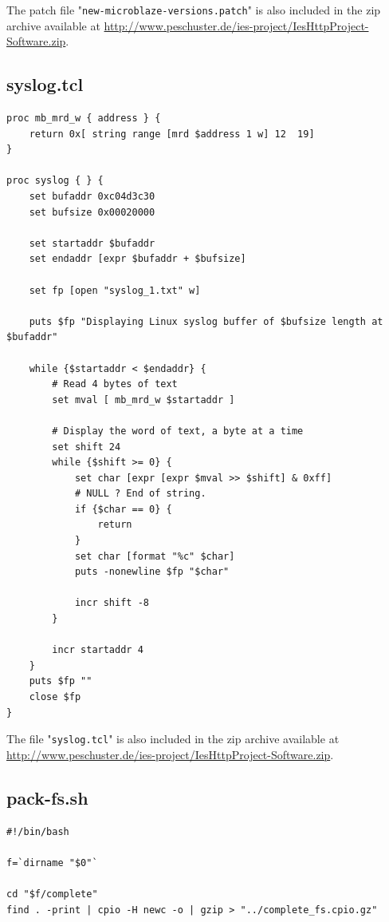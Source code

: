 The patch file "\texttt{new-microblaze-versions.patch}" is also included in the zip archive available at \url{http://www.peschuster.de/ies-project/IesHttpProject-Software.zip}.
\\

\subsection{syslog.tcl}
\label{subsec:syslog}

\begin{verbatim}
proc mb_mrd_w { address } {
    return 0x[ string range [mrd $address 1 w] 12  19]
}

proc syslog { } {
    set bufaddr 0xc04d3c30
    set bufsize 0x00020000

    set startaddr $bufaddr
    set endaddr [expr $bufaddr + $bufsize]
	
    set fp [open "syslog_1.txt" w]

    puts $fp "Displaying Linux syslog buffer of $bufsize length at $bufaddr"
	
    while {$startaddr < $endaddr} {
        # Read 4 bytes of text
        set mval [ mb_mrd_w $startaddr ]

        # Display the word of text, a byte at a time
        set shift 24
        while {$shift >= 0} {
            set char [expr [expr $mval >> $shift] & 0xff]
            # NULL ? End of string.
            if {$char == 0} {
                return
            }
            set char [format "%c" $char]
            puts -nonewline $fp "$char"

            incr shift -8
        }

        incr startaddr 4
    }
    puts $fp ""
    close $fp
}
\end{verbatim}

The file "\texttt{syslog.tcl}" is also included in the zip archive available at \url{http://www.peschuster.de/ies-project/IesHttpProject-Software.zip}.
\\

\subsection{pack-fs.sh}
\label{subsec:pack-fs}

\begin{verbatim}
#!/bin/bash

f=`dirname "$0"`

cd "$f/complete"
find . -print | cpio -H newc -o | gzip > "../complete_fs.cpio.gz"
\end{verbatim}

